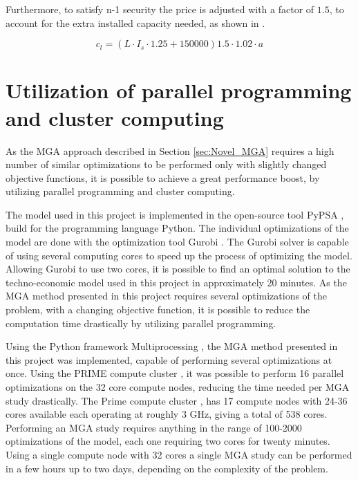 Furthermore, to satisfy n-1 security the price is adjusted with a factor of $1.5$, to account for the extra installed capacity needed, as shown in \cite{PyPSA_euro_30_model}. 

\begin{equation}
c_l = \left( L\cdot I_s \cdot 1.25+150000 \right) 1.5 \cdot 1.02 \cdot a
\end{equation}




\section{Utilization of parallel programming and cluster computing}
As the MGA approach described in Section \ref{sec:Novel_MGA} requires a high number of similar optimizations to be performed only with slightly changed objective functions, it is possible to achieve a great performance boost, by utilizing parallel programming and cluster computing.

The model used in this project is implemented in the open-source tool PyPSA \cite{Pypsa}, build for the programming language Python. The individual optimizations of the model are done with the optimization tool Gurobi \cite{Gurobi}. The Gurobi solver is capable of using several computing cores to speed up the process of optimizing the model. Allowing Gurobi to use two cores, it is possible to find an optimal solution to the techno-economic model used in this project in approximately 20 minutes. As the MGA method presented in this project requires several optimizations of the problem, with a changing objective function, it is possible to reduce the computation time drastically by utilizing parallel programming. 

Using the Python framework  Multiprocessing \cite{Multiprocessing}, the MGA method presented in this project was implemented, capable of performing several optimizations at once. Using the PRIME compute cluster \cite{Prime}, it was possible to perform 16 parallel optimizations on the 32 core compute nodes, reducing the time needed per MGA study drastically. 
The Prime compute cluster \cite{Prime}, has 17 compute nodes with 24-36 cores available each operating at roughly 3 GHz, giving a total of 538 cores. Performing an MGA study requires anything in the range of 100-2000 optimizations of the model, each one requiring two cores for twenty minutes. Using a single compute node with 32 cores a single MGA study can be performed in a few hours up to two days, depending on the complexity of the problem. 

